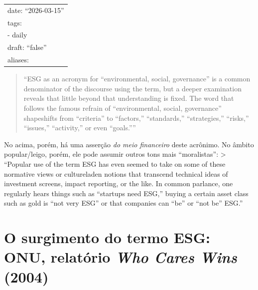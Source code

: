 \documentclass[12pt]{article}
\title{}
\author{}
\date{}
\numberwithin{equation}{section}
\theoremstyle{plain}
\theoremstyle{definition}
\theoremstyle{remark}
\begin{document}
\maketitle

\begin{longtable}[]{@{}l@{}}
\toprule\noalign{}
\endhead
\bottomrule\noalign{}
\endlastfoot
date: ``2026-03-15'' \\
tags: \\
- daily \\
draft: ``false'' \\
aliases: \\
\end{longtable}

\begin{quote}
``ESG as an acronym for ``environmental, social, governance'' is a common denominator of the discourse using the term, but a deeper examination reveals that little beyond that understanding is fixed. The word that follows the famous refrain of ``environmental, social, governance'' shapeshifts from ``criteria'' to ``factors,'' ``standards,'' ``strategies,'' ``risks,'' ``issues,'' ``activity,'' or even ``goals.'''' \parencite[, p. 3]{Pollman2022}
\end{quote}

No acima, porém, há uma asserção \textit{do meio financeiro} deste acrônimo. No âmbito popular/leigo, porém, ele pode assumir outros tons mais ``moralistas'': \textgreater{} ``Popular use of the term ESG has even seemed to take on some of these normative views or cultureladen notions that transcend technical ideas of investment screens, impact reporting, or the like. In common parlance, one regularly hears things such as ``startups need ESG,'' buying a certain asset class such as gold is ``not very ESG'' or that companies can ``be'' or ``not be'' ESG.'' \parencite[, p. 4]{Pollman2022}

\hypertarget{o-surgimento-do-termo-esg-onu-relatuxf3rio-who-cares-wins-2004}{%
\section{\texorpdfstring{O surgimento do termo ESG: ONU, relatório \textit{Who Cares Wins} (2004)}{O surgimento do termo ESG: ONU, relatório Who Cares Wins (2004)}}\label{o-surgimento-do-termo-esg-onu-relatuxf3rio-who-cares-wins-2004}}
\end{document}
